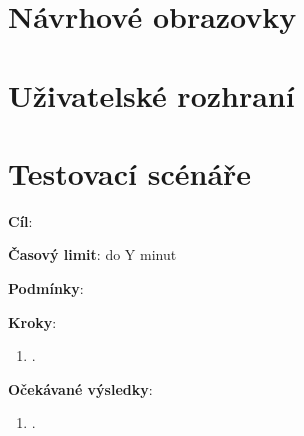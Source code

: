 \chapter{Návrhové obrazovky}\label{appendix:navrhoveObrazovky}


\chapter{Uživatelské rozhraní}\label{appendix:uzivatelskeRozhrani}


\chapter{Testovací scénáře}\label{appendix:testovaciScenare}



\vspace{1em}

\textbf{Cíl}: 

\textbf{Časový limit}: do Y minut

\textbf{Podmínky}: 

\textbf{Kroky}:

\begin{enumerate}[leftmargin=1.4cm]
    \item .
\end{enumerate}

\textbf{Očekávané výsledky}:

\begin{enumerate}[leftmargin=1.4cm]
    \item .
\end{enumerate}
